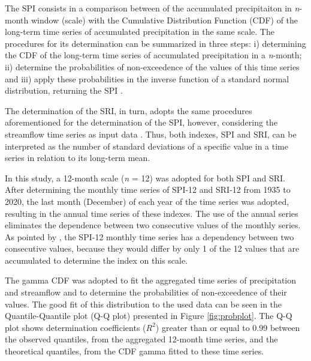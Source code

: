        The SPI consists in a comparison between of the accumulated precipitaiton in \textit{n}-month window (scale) with the Cumulative Distribution Function (CDF) of the long-term time series of accumulated precipitation in the same scale. The procedures for its determination can be summarized in three steps: i) determining the CDF of the long-term time series of accumulated precipitation in a \textit{n}-month; ii) determine the probabilities of non-exceedence of the values of this time series and iii) apply these probabilities in the inverse function of a standard normal distribution, returning the SPI \citep{mckee1993, Mishra2007}. 
        
        The determination of the SRI, in turn, adopts the same procedures aforementioned for the determination of the SPI, however, considering the streamflow time series as input data \citep{Shukla2008}. Thus, both indexes, SPI and SRI, can be interpreted as the number of standard deviations of a specific value in a time series in relation to its long-term mean.

        In this study, a 12-month scale (\textit{n} = 12) was adopted for both SPI and SRI. After determining the monthly time series of SPI-12 and SRI-12 from 1935 to 2020, the last month (December) of each year of the time series was adopted, resulting in the annual time series of these indexes. The use of the annual series eliminates the dependence between two consecutive values of the monthly series. As pointed by \citet{Estacio2022}, the SPI-12 monthly time series has a dependency between two consecutive values, because they would differ by only 1 of the 12 values that are accumulated to determine the index on this scale.

        The gamma CDF was adopted to fit the aggregated time series of precipitation and streamflow and to determine the probabilities of non-exceedence of their values. The good fit of this distribution to the used data can be seen in the Quantile-Quantile plot (Q-Q plot) presented in Figure \ref{fig:probplot}. The Q-Q plot shows determination coefficients (\(R^2\)) greater than or equal to 0.99 between the observed quantiles, from the aggregated 12-month time series, and the theoretical quantiles, from the CDF gamma fitted to these time series.

